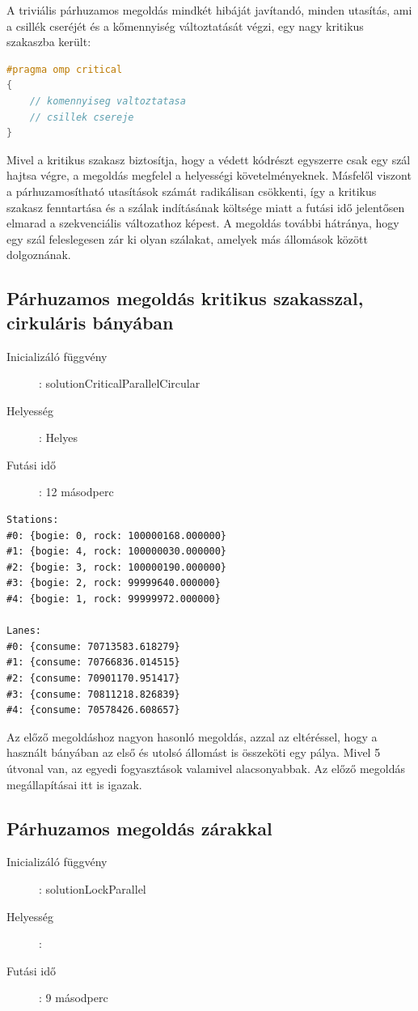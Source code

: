 \documentclass[a4paper,10pt]{article}
\begin{document}
A triviális párhuzamos megoldás mindkét hibáját javítandó, minden utasítás, ami a csillék cseréjét és a kőmennyiség változtatását végzi, egy nagy kritikus szakaszba került:

\begin{lstlisting}[language=c]
#pragma omp critical
{
    // komennyiseg valtoztatasa
    // csillek csereje
}
\end{lstlisting}

Mivel a kritikus szakasz biztosítja, hogy a védett kódrészt egyszerre csak egy szál hajtsa végre, a megoldás megfelel a helyességi követelményeknek. Másfelől viszont a párhuzamosítható utasítások számát radikálisan csökkenti, így a kritikus szakasz fenntartása és a szálak indításának költsége miatt a futási idő jelentősen elmarad a szekvenciális változathoz képest.
A megoldás további hátránya, hogy egy szál feleslegesen zár ki olyan szálakat, amelyek más állomások között dolgoznának.

    \subsection{Párhuzamos megoldás kritikus szakasszal, cirkuláris bányában}
\begin{description}
  \item[Inicializáló függvény]: solutionCriticalParallelCircular
  \item[Helyesség]: Helyes
  \item[Futási idő]: 12 másodperc
\end{description}

\begin{lstlisting}
Stations:
#0: {bogie: 0, rock: 100000168.000000}
#1: {bogie: 4, rock: 100000030.000000}
#2: {bogie: 3, rock: 100000190.000000}
#3: {bogie: 2, rock: 99999640.000000}
#4: {bogie: 1, rock: 99999972.000000}

Lanes:
#0: {consume: 70713583.618279}
#1: {consume: 70766836.014515}
#2: {consume: 70901170.951417}
#3: {consume: 70811218.826839}
#4: {consume: 70578426.608657}
\end{lstlisting}

Az előző megoldáshoz nagyon hasonló megoldás, azzal az eltéréssel, hogy a használt bányában az első és utolsó állomást is összeköti egy pálya. Mivel 5 útvonal van, az egyedi fogyasztások valamivel alacsonyabbak. Az előző megoldás megállapításai itt is igazak.



    \subsection{Párhuzamos megoldás zárakkal}
\begin{description}
  \item[Inicializáló függvény]: solutionLockParallel
  \item[Helyesség]: 
  \item[Futási idő]: 9 másodperc
\end{description}
\end{document}
